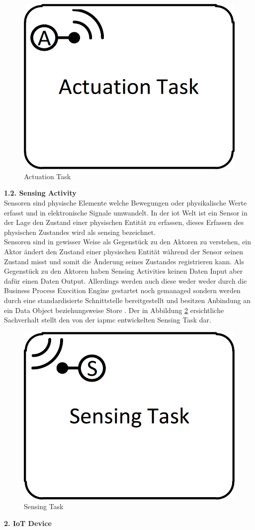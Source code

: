 \documentclass[a4paper, 12pt, twoside, headsepline=true]{scrartcl} %
\begin{document}
\begin{figure}[H]
	\includegraphics[height=2 cm,keepaspectratio,center]{figures/ActuationTask}
	\caption{Actuation Task \cite[S.44]{conceptsiotawarepm}}
	\label{fig:actuationtask}
\end{figure} 

\textbf{1.2. Sensing Activity}\\

Sensoren sind physische Elemente welche Bewegungen oder physikalische Werte erfasst und in elektronische Signale umwandelt. In der \ac{iot} Welt ist ein Sensor in der Lage den Zustand einer physischen Entität zu erfassen, dieses Erfassen des physischen Zustandes wird als sensing bezeichnet.\\
Sensoren sind in gewisser Weise als Gegenstück zu den Aktoren zu verstehen, ein Aktor ändert den Zustand einer physischen Entität während der Sensor seinen Zustand misst und somit die Änderung seines Zustandes registrieren kann. Als Gegenstück zu den Aktoren haben Sensing Activities keinen Daten Input aber dafür einen Daten Output. Allerdings werden auch diese weder weder durch die Business Process Execition Engine gestartet noch gemanaged sondern werden durch eine standardisierte Schnittstelle bereitgestellt und besitzen Anbindung an ein Data Object beziehungsweise Store \cite[S.45]{conceptsiotawarepm}. Der in Abbildung \ref{fig:sensingtask} ersichtliche Sachverhalt stellt den von der \ac{iapmc} entwickelten Sensing Task dar.

\begin{figure}[H]
	\includegraphics[height=2 cm,keepaspectratio,center]{figures/SensingTask}
	\caption{Sensing Task \cite[S.49]{conceptsiotawarepm}}
	\label{fig:sensingtask}
\end{figure} 

\textbf{2. IoT Device}\\
\end{document}
